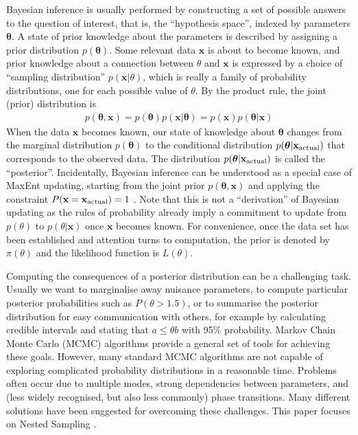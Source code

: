 \documentclass[
  ,final            %
  ]
  {aipproc}
\newcommand{\pars}{\boldsymbol{\theta}}
\newcommand{\data}{\mathbf{x}}
\begin{document}
Bayesian inference is usually performed by
constructing a set of possible answers to the question of
interest, that is, the ``hypothesis space'', indexed by parameters $\pars$.
A state of prior knowledge about the parameters is described by assigning a
prior distribution $p(\pars)$. Some relevant data $\data$ is about to become
known, and prior knowledge about a connection between $\theta$ and $\data$ is
expressed by a choice of ``sampling distribution'' $p(\data | \theta)$, which
is really a family of probability distributions, one for each possible value of
$\theta$. By the product rule, the joint (prior) distribution is
\begin{eqnarray}
p(\pars, \data) = p(\pars) p(\data | \pars) = p(\data)p(\pars | \data)
\end{eqnarray}
When the
data $\data$ becomes known, our state of knowledge about $\pars$ changes
from the marginal distribution $p(\pars)$ to the conditional distribution
$p(\pars | \data_{\rm actual})$
that corresponds to the observed data. The distribution
$p(\pars | \data_{\rm actual})$ is
called the ``posterior''.
Incidentally, Bayesian inference can be understood as a special case of
MaxEnt updating, starting from the joint prior $p(\pars, \data)$ and applying
the constraint $P(\data = \data_{\rm actual}) = 1$ \citep{caticha}. Note that
this is not a ``derivation'' of Bayesian updating as the rules of probability
already imply a commitment to update from $p(\theta)$ to $p(\theta | \data)$
once $\data$ becomes known. For convenience, once the data set has been
established and attention turns to computation, the prior is denoted by
$\pi(\theta)$ and the likelihood function is $L(\theta)$.

Computing the consequences of a posterior distribution can be a challenging
task. Usually we want to marginalise away nuisance parameters, to compute
particular posterior probabilities such as $P(\theta > 1.5)$, or to summarise
the posterior distribution for easy communication with others, for example by
calculating credible intervals and stating that $a \leq \theta b$ with 95\%
probability.
Markov Chain Monte Carlo (MCMC) algorithms provide a general set of tools
for achieving these goals. However, many standard MCMC algorithms are not
capable of exploring complicated probability distributions in a reasonable time.
Problems often occur due to multiple modes, strong dependencies
between parameters, and (less widely recognised, but also less commonly) phase
transitions. Many different solutions have been suggested for overcoming these
challenges. This paper focuses on Nested Sampling \citep{skilling}.
\end{document}

